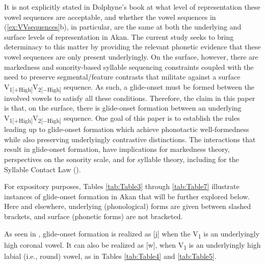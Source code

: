 \documentclass[output=paper,colorlinks,citecolor=brown]{langscibook}
\begin{document}
It is not explicitly stated in Dolphyne’s book at what level of representation these vowel sequences are acceptable, and whether the vowel sequences in (\ref{ex:VVsequences}b), in particular, are the same at both the underlying and surface levels of representation in Akan. The current study seeks to bring determinacy to this matter by providing the relevant phonetic evidence that these vowel sequences are only present underlyingly. On the surface, however, there are markedness and sonority-based syllable sequencing constraints coupled with the need to preserve segmental/feature contrasts that militate against a surface V\textsubscript{1[+High]}V\textsubscript{2[−High]} sequence. As such, a glide-onset must be formed between the involved vowels to satisfy all these conditions. Therefore, the claim in this paper is that, on the surface, there is glide-onset formation between an underlying V\textsubscript{1[+High]}V\textsubscript{2[−High]} sequence. One goal of this paper is to establish the rules leading up to glide-onset formation which achieve phonotactic well-formedness while also  preserving underlyingly contrastive distinctions. The interactions that result in glide-onset formation, have implications for markedness theory, perspectives on the sonority scale, and for syllable theory, including for the Syllable Contact Law  (\cite{MurrayVennemann1983}).      

For expository purposes, Tables \ref{tab:Table3} through \ref{tab:Table7} illustrate instances of glide-onset formation in Akan that will be further explored below. Here and elsewhere, underlying (phonological) forms are given between slashed brackets, and surface (phonetic forms) are not bracketed.%
 
As seen in , glide-onset formation is realized as [j] when the V\textsubscript{1} is an underlyingly high coronal vowel. It can also be realized as [w], when V\textsubscript{1} is an underlyingly high labial (i.e., round) vowel, as in Tables \ref{tab:Table4} and \ref{tab:Table5}.
\end{document}
